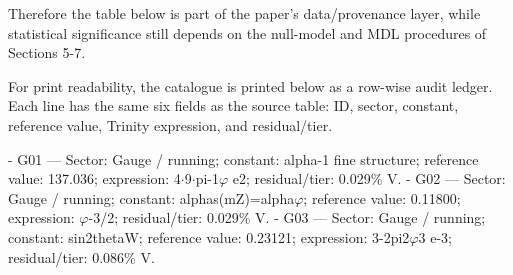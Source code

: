   Therefore the table below is part of the paper's data/provenance layer, while statistical
  significance still depends on the null-model and MDL procedures of Sections 5-7.

  For print readability, the catalogue is printed below as a row-wise audit ledger. Each
  line has the same six fields as the source table: ID, sector, constant, reference value,
  Trinity expression, and residual/tier.

  - G01 --- Sector: Gauge / running; constant: alpha-1 fine structure; reference value:
  137.036; expression: 4$\cdot$9$\cdot$pi-1$\varphi$ e2; residual/tier: 0.029\% V.
  - G02 --- Sector: Gauge / running; constant: alphas(mZ)=alpha$\varphi$; reference value:
  0.11800; expression: $\varphi$-3/2; residual/tier: 0.029\% V.
  - G03 --- Sector: Gauge / running; constant: sin2thetaW; reference value: 0.23121;
  expression: 3-2pi2$\varphi$3 e-3; residual/tier: 0.086\% V.

